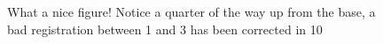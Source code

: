 \begin{figure}[htbp]
    \caption{What a nice figure! Notice a quarter of the way up from the base, a bad registration between 1 and 3 has been corrected in 10}
    \label{fig:dummy_cross_sections}
  \end{figure}
  
